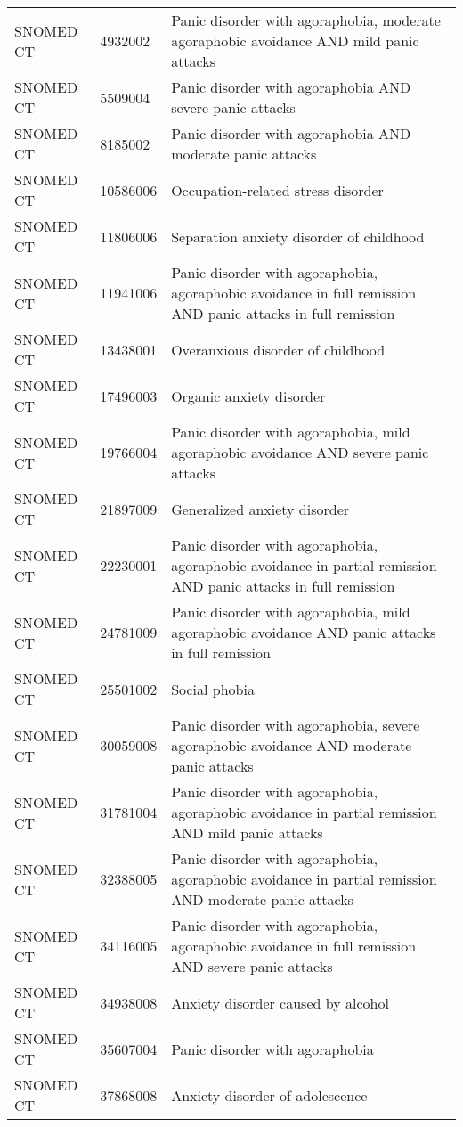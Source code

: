 \begin{longtable}{p{}p{}p{}}
  SNOMED CT & 4932002 & Panic disorder with agoraphobia, moderate agoraphobic avoidance AND mild panic attacks \\ 
  SNOMED CT & 5509004 & Panic disorder with agoraphobia AND severe panic attacks \\ 
  SNOMED CT & 8185002 & Panic disorder with agoraphobia AND moderate panic attacks \\ 
  SNOMED CT & 10586006 & Occupation-related stress disorder \\ 
  SNOMED CT & 11806006 & Separation anxiety disorder of childhood \\ 
  SNOMED CT & 11941006 & Panic disorder with agoraphobia, agoraphobic avoidance in full remission AND panic attacks in full remission \\ 
  SNOMED CT & 13438001 & Overanxious disorder of childhood \\ 
  SNOMED CT & 17496003 & Organic anxiety disorder \\ 
  SNOMED CT & 19766004 & Panic disorder with agoraphobia, mild agoraphobic avoidance AND severe panic attacks \\ 
  SNOMED CT & 21897009 & Generalized anxiety disorder \\ 
  SNOMED CT & 22230001 & Panic disorder with agoraphobia, agoraphobic avoidance in partial remission AND panic attacks in full remission \\ 
  SNOMED CT & 24781009 & Panic disorder with agoraphobia, mild agoraphobic avoidance AND panic attacks in full remission \\ 
  SNOMED CT & 25501002 & Social phobia \\ 
  SNOMED CT & 30059008 & Panic disorder with agoraphobia, severe agoraphobic avoidance AND moderate panic attacks \\ 
  SNOMED CT & 31781004 & Panic disorder with agoraphobia, agoraphobic avoidance in partial remission AND mild panic attacks \\ 
  SNOMED CT & 32388005 & Panic disorder with agoraphobia, agoraphobic avoidance in partial remission AND moderate panic attacks \\ 
  SNOMED CT & 34116005 & Panic disorder with agoraphobia, agoraphobic avoidance in full remission AND severe panic attacks \\ 
  SNOMED CT & 34938008 & Anxiety disorder caused by alcohol \\ 
  SNOMED CT & 35607004 & Panic disorder with agoraphobia \\ 
  SNOMED CT & 37868008 & Anxiety disorder of adolescence \\ 

\end{longtable}
